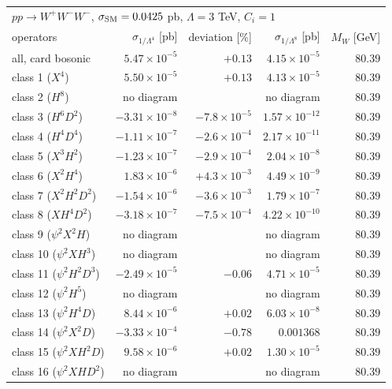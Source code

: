 \begin{table}[t]\centering\footnotesize\setlength{\tabcolsep}{4pt}
\begin{tabular}{@{}lrrrr@{}}\hline
\multicolumn{5}{l}{$p p \to W^+ W^- W^-$, $\sigma_{\rm SM} = 0.0425$ pb, $\Lambda = 3$ TeV, $C_i = 1$}\\
operators & $\sigma_{1/\Lambda^4}$ [pb] & deviation [\%] & $\sigma_{1/\Lambda^8}$ [pb] & $M_W$ [GeV]\\\hline
all, card bosonic & $5.47\times 10^{-5}$ & $+0.13$ & $4.15\times 10^{-5}$ & $80.39$\\
class 1 ($X^4$) & $5.50\times 10^{-5}$ & $+0.13$ & $4.13\times 10^{-5}$ & $80.39$\\
class 2 ($H^8$) & no diagram &  & no diagram & $80.39$\\
class 3 ($H^6 D^2$) & $-3.31\times 10^{-8}$ & $-7.8\times 10^{-5}$ & $1.57\times 10^{-12}$ & $80.39$\\
class 4 ($H^4 D^4$) & $-1.11\times 10^{-7}$ & $-2.6\times 10^{-4}$ & $2.17\times 10^{-11}$ & $80.39$\\
class 5 ($X^3 H^2$) & $-1.23\times 10^{-7}$ & $-2.9\times 10^{-4}$ & $2.04\times 10^{-8}$ & $80.39$\\
class 6 ($X^2 H^4$) & $1.83\times 10^{-6}$ & $+4.3\times 10^{-3}$ & $4.49\times 10^{-9}$ & $80.39$\\
class 7 ($X^2 H^2 D^2$) & $-1.54\times 10^{-6}$ & $-3.6\times 10^{-3}$ & $1.79\times 10^{-7}$ & $80.39$\\
class 8 ($X H^4 D^2$) & $-3.18\times 10^{-7}$ & $-7.5\times 10^{-4}$ & $4.22\times 10^{-10}$ & $80.39$\\
class 9 ($\psi^2 X^2 H$) & no diagram &  & no diagram & $80.39$\\
class 10 ($\psi^2 X H^3$) & no diagram &  & no diagram & $80.39$\\
class 11 ($\psi^2 H^2 D^3$) & $-2.49\times 10^{-5}$ & $-0.06$ & $4.71\times 10^{-5}$ & $80.39$\\
class 12 ($\psi^2 H^5$) & no diagram &  & no diagram & $80.39$\\
class 13 ($\psi^2 H^4 D$) & $8.44\times 10^{-6}$ & $+0.02$ & $6.03\times 10^{-8}$ & $80.39$\\
class 14 ($\psi^2 X^2 D$) & $-3.33\times 10^{-4}$ & $-0.78$ & $0.001368$ & $80.39$\\
class 15 ($\psi^2 X H^2 D$) & $9.58\times 10^{-6}$ & $+0.02$ & $1.30\times 10^{-5}$ & $80.39$\\
class 16 ($\psi^2 X H D^2$) & no diagram &  & no diagram & $80.39$\\

\end{tabular}
\end{table}
